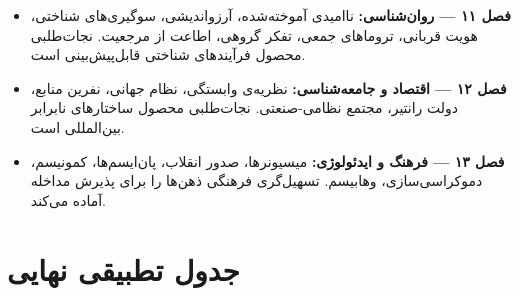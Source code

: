 \begin{tcolorbox}[wavebox, title={بخش چهارم: تحلیل ساختاری (فصل‌های ۱۱–۱۳)}]
\begin{itemize}
\item \textbf{فصل ۱۱ — روان‌شناسی:} ناامیدی آموخته‌شده، آرزواندیشی، سوگیری‌های شناختی، هویت قربانی، تروماهای جمعی، تفکر گروهی، اطاعت از مرجعیت. نجات‌طلبی محصول فرآیندهای شناختی قابل‌پیش‌بینی است.
\item \textbf{فصل ۱۲ — اقتصاد و جامعه‌شناسی:} نظریه‌ی وابستگی، نظام جهانی، نفرین منابع، دولت رانتیر، مجتمع نظامی-صنعتی. نجات‌طلبی محصول ساختارهای نابرابر بین‌المللی است.
\item \textbf{فصل ۱۳ — فرهنگ و ایدئولوژی:} میسیونرها، صدور انقلاب، پان‌ایسم‌ها، کمونیسم، دموکراسی‌سازی، وهابیسم. تسهیل‌گری فرهنگی ذهن‌ها را برای پذیرش مداخله آماده می‌کند.
\end{itemize}
\end{tcolorbox}


\section{جدول تطبیقی نهایی}
\label{sec:ch14-master-table}


